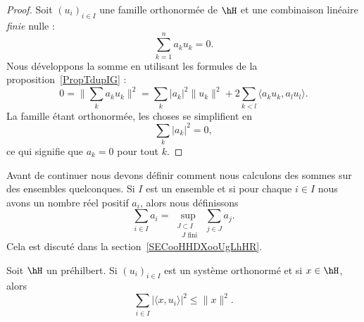 \begin{proof}
    Soit \( (u_i)_{i\in I}\) une famille orthonormée de \( \hH\) et une combinaison linéaire \emph{finie} nulle :
    \begin{equation}
        \sum_{k=1}^{n}a_ku_k=0.
    \end{equation}
    Nous développons la somme en utilisant les formules de la proposition~\ref{PropTdupIG} :
    \begin{equation}
        0=\| \sum_ka_ku_k \|^2=\sum_k| a_k |^2\| u_k \|^2+2\sum_{k<l}\langle a_ku_k, a_lu_l\rangle .
    \end{equation}
    La famille étant orthonormée, les choses se simplifient en
    \begin{equation}
        \sum_k| a_k |^2=0,
    \end{equation}
    ce qui signifie que \( a_k=0\) pour tout \( k\).
\end{proof}

Avant de continuer nous devons définir comment nous calculons des sommes sur des ensembles quelconques. Si \( I\) est un ensemble et si pour chaque \( i\in I\) nous avons un nombre réel positif \( a_i\), alors nous définissons
\begin{equation}
    \sum_{i\in I}a_i=\sup_{\substack{J\subset I\\\text{ } J\text{ fini }}}\sum_{j\in J} a_j.
\end{equation}
Cela est discuté dans la section~\ref{SECooHHDXooUgLhHR}.

\begin{proposition}    \label{PropHKqVHj}
    Soit \( \hH\) un préhilbert. Si \( (u_i)_{i\in I}\) est un système orthonormé et si \( x\in \hH\), alors
    \begin{equation}        \label{EQooWCYZooOPzGaw}
        \sum_{i\in I}\big| \langle x, u_i\rangle  \big|^2\leq \| x \|^2.
    \end{equation}
\end{proposition}

